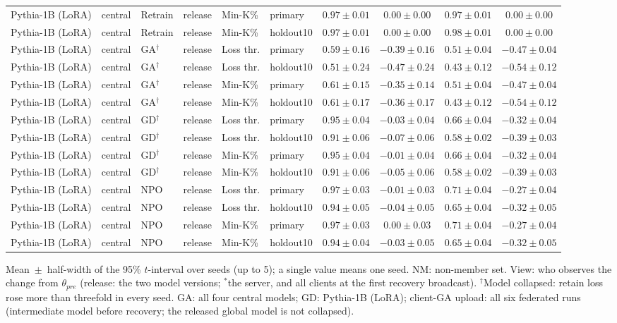 {\begin{longtable}{@{\extracolsep{\fill}}llllllcccc@{}}
Pythia-1B (LoRA) & central & Retrain & release & Min-K\% & primary & $0.97 \pm 0.01$ & $0.00 \pm 0.00$ & $0.97 \pm 0.01$ & $0.00 \pm 0.00$ \\
Pythia-1B (LoRA) & central & Retrain & release & Min-K\% & holdout10 & $0.97 \pm 0.01$ & $0.00 \pm 0.00$ & $0.98 \pm 0.01$ & $0.00 \pm 0.00$ \\
Pythia-1B (LoRA) & central & GA$^{\dagger}$ & release & Loss thr. & primary & $0.59 \pm 0.16$ & $-0.39 \pm 0.16$ & $0.51 \pm 0.04$ & $-0.47 \pm 0.04$ \\
Pythia-1B (LoRA) & central & GA$^{\dagger}$ & release & Loss thr. & holdout10 & $0.51 \pm 0.24$ & $-0.47 \pm 0.24$ & $0.43 \pm 0.12$ & $-0.54 \pm 0.12$ \\
Pythia-1B (LoRA) & central & GA$^{\dagger}$ & release & Min-K\% & primary & $0.61 \pm 0.15$ & $-0.35 \pm 0.14$ & $0.51 \pm 0.04$ & $-0.47 \pm 0.04$ \\
Pythia-1B (LoRA) & central & GA$^{\dagger}$ & release & Min-K\% & holdout10 & $0.61 \pm 0.17$ & $-0.36 \pm 0.17$ & $0.43 \pm 0.12$ & $-0.54 \pm 0.12$ \\
Pythia-1B (LoRA) & central & GD$^{\dagger}$ & release & Loss thr. & primary & $0.95 \pm 0.04$ & $-0.03 \pm 0.04$ & $0.66 \pm 0.04$ & $-0.32 \pm 0.04$ \\
Pythia-1B (LoRA) & central & GD$^{\dagger}$ & release & Loss thr. & holdout10 & $0.91 \pm 0.06$ & $-0.07 \pm 0.06$ & $0.58 \pm 0.02$ & $-0.39 \pm 0.03$ \\
Pythia-1B (LoRA) & central & GD$^{\dagger}$ & release & Min-K\% & primary & $0.95 \pm 0.04$ & $-0.01 \pm 0.04$ & $0.66 \pm 0.04$ & $-0.32 \pm 0.04$ \\
Pythia-1B (LoRA) & central & GD$^{\dagger}$ & release & Min-K\% & holdout10 & $0.91 \pm 0.06$ & $-0.05 \pm 0.06$ & $0.58 \pm 0.02$ & $-0.39 \pm 0.03$ \\
Pythia-1B (LoRA) & central & NPO & release & Loss thr. & primary & $0.97 \pm 0.03$ & $-0.01 \pm 0.03$ & $0.71 \pm 0.04$ & $-0.27 \pm 0.04$ \\
Pythia-1B (LoRA) & central & NPO & release & Loss thr. & holdout10 & $0.94 \pm 0.05$ & $-0.04 \pm 0.05$ & $0.65 \pm 0.04$ & $-0.32 \pm 0.05$ \\
Pythia-1B (LoRA) & central & NPO & release & Min-K\% & primary & $0.97 \pm 0.03$ & $0.00 \pm 0.03$ & $0.71 \pm 0.04$ & $-0.27 \pm 0.04$ \\
Pythia-1B (LoRA) & central & NPO & release & Min-K\% & holdout10 & $0.94 \pm 0.04$ & $-0.03 \pm 0.05$ & $0.65 \pm 0.04$ & $-0.32 \pm 0.05$ \\
\end{longtable}
Mean~$\pm$~half-width of the 95\% $t$-interval over seeds (up to 5); a single value means one seed. NM: non-member set. View: who observes the change from $\theta_{pre}$ (release: the two model versions; $^{*}$the server, and all clients at the first recovery broadcast). $^{\dagger}$Model collapsed: retain loss rose more than threefold in every seed. GA: all four central models; GD: Pythia-1B (LoRA); client-GA upload: all six federated runs (intermediate model before recovery; the released global model is not collapsed).\par
}
